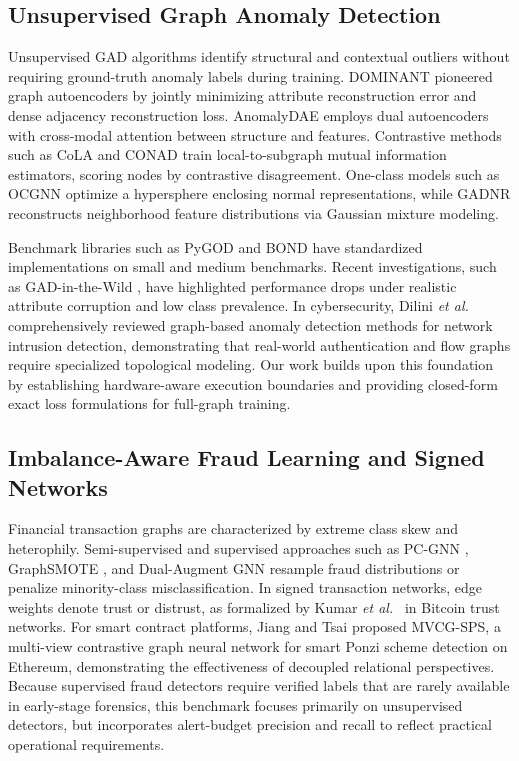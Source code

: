 \documentclass[11pt,a4paper]{article}
\newcommand{\etal}{\emph{et al.}}
\begin{document}
\subsection{Unsupervised Graph Anomaly Detection}
Unsupervised GAD algorithms identify structural and contextual outliers without requiring ground-truth anomaly labels during training. DOMINANT \cite{ding2019deep} pioneered graph autoencoders by jointly minimizing attribute reconstruction error and dense adjacency reconstruction loss. AnomalyDAE \cite{fan2020anomalydae} employs dual autoencoders with cross-modal attention between structure and features. Contrastive methods such as CoLA \cite{liu2022cola} and CONAD \cite{xu2022conad} train local-to-subgraph mutual information estimators, scoring nodes by contrastive disagreement. One-class models such as OCGNN \cite{wang2021ocgnn} optimize a hypersphere enclosing normal representations, while GADNR \cite{roy2024gadnr} reconstructs neighborhood feature distributions via Gaussian mixture modeling. 

Benchmark libraries such as PyGOD \cite{liu2024pygod} and BOND \cite{liu2022bond} have standardized implementations on small and medium benchmarks. Recent investigations, such as GAD-in-the-Wild \cite{zhou2026wild}, have highlighted performance drops under realistic attribute corruption and low class prevalence. In cybersecurity, Dilini \etal\ \cite{dilini2026comprehensive} comprehensively reviewed graph-based anomaly detection methods for network intrusion detection, demonstrating that real-world authentication and flow graphs require specialized topological modeling. Our work builds upon this foundation by establishing hardware-aware execution boundaries and providing closed-form exact loss formulations for full-graph training.

\subsection{Imbalance-Aware Fraud Learning and Signed Networks}
Financial transaction graphs are characterized by extreme class skew and heterophily. Semi-supervised and supervised approaches such as PC-GNN \cite{liu2021pcgnn}, GraphSMOTE \cite{zhao2021graphsmote}, and Dual-Augment GNN \cite{li2022dualaugment} resample fraud distributions or penalize minority-class misclassification. In signed transaction networks, edge weights denote trust or distrust, as formalized by Kumar \etal\ \cite{kumar2016edge} in Bitcoin trust networks. For smart contract platforms, Jiang and Tsai \cite{jiang2025mvcg} proposed MVCG-SPS, a multi-view contrastive graph neural network for smart Ponzi scheme detection on Ethereum, demonstrating the effectiveness of decoupled relational perspectives. Because supervised fraud detectors require verified labels that are rarely available in early-stage forensics, this benchmark focuses primarily on unsupervised detectors, but incorporates alert-budget precision and recall to reflect practical operational requirements.
\end{document}
